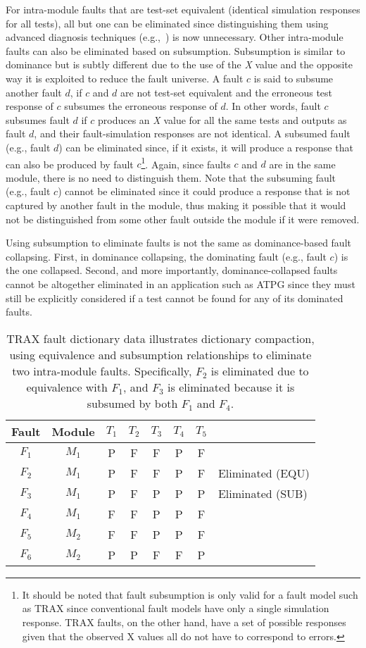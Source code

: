 For intra-module faults that are test-set equivalent (identical simulation responses for all tests), all but one can be eliminated since distinguishing them using advanced diagnosis techniques (e.g.,~\cite{desineni05}) is now unnecessary.
%
Other intra-module faults can also be eliminated based on subsumption.
%
Subsumption is similar to dominance but is subtly different due to the use of the \textit{X} value and the opposite way it is exploited to reduce the fault universe.
%
A fault $c$ is said to subsume another fault $d$, if $c$ and $d$ are not test-set equivalent and the erroneous test response of $c$ subsumes the erroneous response of $d$.
%
In other words, fault $c$ subsumes fault $d$ if $c$ produces an \textit{X} value for all the same tests and outputs as fault $d$, and their fault-simulation responses are not identical.
%
A subsumed fault (e.g., fault $d$) can be eliminated since, if it exists, it will produce a response that can also be produced by fault $c$\footnote{It should be noted that fault subsumption is only valid for a fault model such as TRAX since conventional fault models have only a single simulation response.
%
TRAX faults, on the other hand, have a set of possible responses given that the observed X values all do not have to correspond to errors.}.
%
Again, since faults $c$ and $d$ are in the same module, there is no need to distinguish them.
%
Note that the subsuming fault (e.g., fault $c$) cannot be eliminated since it could produce a response that is not captured by another fault in the module, thus making it possible that it would not be distinguished from some other fault outside the module if it were removed.

Using subsumption to eliminate faults is not the same as dominance-based fault collapsing.
%
First, in dominance collapsing, the dominating fault (e.g., fault $c$) is the one collapsed.
%
Second, and more importantly, dominance-collapsed faults cannot be altogether eliminated in an application such as ATPG since they must still be explicitly considered if a test cannot be found for any of its dominated faults.

\begin{table}[hbtp]
\centering
\begin{tabular*}{0.9\columnwidth}{@{\extracolsep{\fill}}cccccccl}
\toprule
Fault&Module&$T_1$&$T_2$&$T_3$&$T_4$&$T_5$&\\
\midrule
$F_1$&$M_1$&P&F&F&P&F&\\
$F_2$&$M_1$&P&F&F&P&F&Eliminated (EQU)\\
$F_3$&$M_1$&P&F&P&P&P&Eliminated (SUB)\\
$F_4$&$M_1$&F&F&P&P&F&\\
\midrule
$F_5$&$M_2$&F&F&P&P&F&\\
$F_6$&$M_2$&P&P&F&F&P&\\
\bottomrule
\end{tabular*}
\caption{TRAX fault dictionary data illustrates dictionary compaction, using equivalence and subsumption relationships to eliminate two intra-module faults.
%
Specifically, $F_2$ is eliminated due to equivalence with $F_1$, and $F_3$ is eliminated because it is subsumed by both $F_1$ and $F_4$.}
\label{table:dict_fault_resp}
\end{table}

